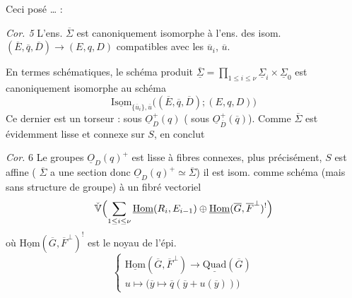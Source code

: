 \documentclass[11pt,a4paper]{article}
\begin{document}
Ceci posé … :

\emph{Cor. 5} L'ens. $\overline{\Sigma}$ est canoniquement isomorphe à
l'ens. des isom. $(\overline{E},\overline{q},\overline{D}) \to (E,q,D)$
compatibles avec les $\overline{u}_i$, $\overline{u}$.

En termes schématiques, le schéma
produit $\underline{\overline{\Sigma}} = \prod_{1\le i\le\nu}\underline{\Sigma}_i\times\underline{\Sigma}_0$
est canoniquement 
isomorphe au schéma
\[
\underline{\mathrm{Isom}}_{\{\overline{u}_i\},\overline{u}}\bigl((\overline{E},\overline{q},\overline{D});(E,q,D)\bigr)
\]
Ce dernier est un torseur : 
sous $\underline{O}^{+}_D(q)$ ( sous $\underline{O}^{+}_{\overline{D}}(\overline{q})$).
Comme $\overline{\Sigma}$ est évidemment lisse et connexe
sur $S$,  en conclut

\emph{Cor.} 6 Le  groupes $\underline{O}_D(q)^{+}$ est lisse à
fibres connexes, plus précisément,   $S$ est affine
( $\overline{\Sigma}$ a une section donc $\underline{O}_D(q)^{+}\simeq\overline{\Sigma}$) il est
isom. comme schéma (mais sans structure de groupe) à un fibré  vectoriel
\[
\check{\mathbb{V}}\Bigl(\sum_{1\le i\le\nu}\underline{\mathrm{Hom}}(R_i,E_{i-1})\oplus\underline{\mathrm{Hom}}(\overline{G},\overline{F}^{\perp})^{!}\Bigr)
\]
où $\underline{\mathrm{Hom}}(\overline{G},\overline{F}^{\perp})^{!}$ est le noyau de l'épi.
\[
\begin{cases}
\underline{\mathrm{Hom}}(\overline{G},\overline{F}^{\perp}) \longrightarrow \underline{\mathrm{Quad}}(\overline{G})\\
u \longmapsto \bigl(\overline{y}\mapsto \overline{q}(\overline{y}+u(\overline{y}))\bigr)
\end{cases}
\]
\end{document}
